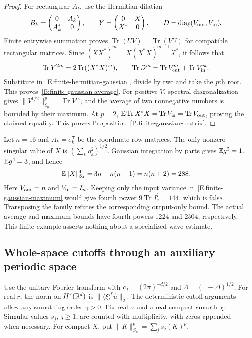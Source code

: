 \begin{proof}
  For rectangular $A_k$, use the Hermitian dilation
  \[
    B_k=\begin{pmatrix}0&A_k\\A_k^*&0\end{pmatrix},\qquad
    Y=\begin{pmatrix}0&X\\X^*&0\end{pmatrix},\qquad
    D=\operatorname{diag}(V_{\rm out},V_{\rm in}).
  \]
  Finite entrywise summation proves $\operatorname{Tr}(UV)=\operatorname{Tr}(VU)$
  for compatible rectangular matrices. Since
  $(XX^*)^m=X(X^*X)^{m-1}X^*$, it follows that
  \[
    \operatorname{Tr}Y^{2m}=2\operatorname{Tr}((X^*X)^m),\qquad
    \operatorname{Tr}D^m=\operatorname{Tr}V_{\rm out}^m+
    \operatorname{Tr}V_{\rm in}^m.
  \]
  Substitute in~\eqref{E:finite-hermitian-gaussian}, divide by two and
  take the $p$th root. This proves~\eqref{E:finite-gaussian-average}.
  For positive $V$, spectral diagonalization gives
  $\|V^{1/2}\|_{S_p}^p=\operatorname{Tr}V^m$, and the average of two
  nonnegative numbers is bounded by their maximum. At $p=2$,
  $\mathbb{E}\operatorname{Tr}X^*X=\operatorname{Tr}V_{\rm in}
  =\operatorname{Tr}V_{\rm out}$, proving the claimed equality.
  This proves Proposition~\ref{P:finite-gaussian-matrix}.
\end{proof}

\begin{remark}
  \label{R:gaussian-one-variance-test}
  Let $n=16$ and $A_k=e_k^{\mathsf T}$ be the coordinate row matrices.
  The only nonzero singular value of $X$ is $(\sum_k g_k^2)^{1/2}$.
  Gaussian integration by parts gives $\mathbb{E} g^2=1$, $\mathbb{E} g^4=3$, and hence
  \[
    \mathbb{E}\|X\|_{S_4}^4=3n+n(n-1)=n(n+2)=288.
  \]
  Here $V_{\rm out}=n$ and $V_{\rm in}=I_n$. Keeping only the input
  variance in~\eqref{E:finite-gaussian-maximum} would give fourth power
  $9\operatorname{Tr}I_n^2=144$, which is false. Transposing the family
  refutes the corresponding output-only bound. The actual average and
  maximum bounds have fourth powers $1224$ and $2304$, respectively.
  This finite example asserts nothing about a specialized wave estimate.
\end{remark}

\subsection{Whole-space cutoffs through an auxiliary periodic space}

Use the unitary Fourier transform with $c_d=(2\pi)^{-d/2}$ and
$\Lambda=(1-\Delta)^{1/2}$. For real $r$, the norm on $H^r(\mathbb{R}^d)$ is
$\|\langle\xi\rangle^r\widehat u\|_2$. The deterministic cutoff arguments
allow any smoothing order $\gamma > 0$. Fix real $\sigma$ and a real compact
smooth $\chi$.
Singular values $s_j$, $j \ge 1$, are counted with multiplicity, with zeros
appended when necessary. For compact $K$, put
$\|K\|_{S_p}^p=\sum_j s_j(K)^p$.

